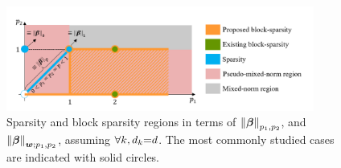 \begin{figure}[!t]
\centering
\includegraphics[width=0.9\textwidth,keepaspectratio]{images/Weighted-MixedNorm-Map.png}
\centering
\caption{Sparsity and block sparsity regions in terms of $\left\lVert\boldsymbol{\beta}\right\rVert_{p_1,p_2}$, and $\left\lVert\boldsymbol{\beta}\right\rVert_{\boldsymbol{w};p_1,p_2}$, assuming $\forall k, d_k {=} d$. The most commonly studied cases are indicated with solid circles.}
\label{fig:MixedNorm-Map}
\end{figure}